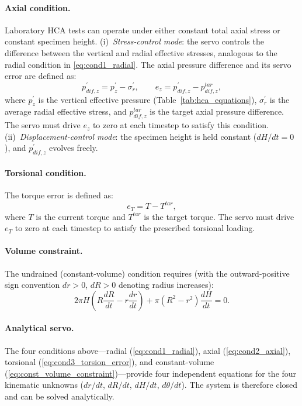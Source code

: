 \documentclass[a4paper,fleqn]{cas-sc}
\begin{document}
\paragraph{Axial condition.}
Laboratory HCA tests can operate under either constant total axial stress or constant specimen height.
(i)~\emph{Stress-control mode}: the servo controls the difference between the vertical and radial effective stresses, analogous to the radial condition in \cref{eq:cond1_radial}. The axial pressure difference and its servo error are defined as:
\begin{equation}
p_{dif,z}^{\prime} = p_z^{\prime} - \sigma_r^{\prime}, \qquad e_z = p_{dif,z}^{\prime} - p_{dif,z}^{tar},
\label{eq:cond2_axial}
\end{equation}
where $p_z^{\prime}$ is the vertical effective pressure (Table~\ref{tab:hca_equations}), $\sigma_r^{\prime}$ is the average radial effective stress, and $p_{dif,z}^{tar}$ is the target axial pressure difference. The servo must drive $e_z$ to zero at each timestep to satisfy this condition.
(ii)~\emph{Displacement-control mode}: the specimen height is held constant ($dH/dt=0$), and $p_{dif,z}^{\prime}$ evolves freely.

\paragraph{Torsional condition.}
The torque error is defined as:
\begin{equation}
e_T = T - T^{tar},
\label{eq:cond3_torsion_error}
\end{equation}
where $T$ is the current torque and $T^{tar}$ is the target torque. The servo must drive $e_T$ to zero at each timestep to satisfy the prescribed torsional loading.

\paragraph{Volume constraint.}
The undrained (constant-volume) condition requires (with the outward-positive sign convention $dr>0$, $dR>0$ denoting radius increases):
\begin{equation}
2\pi H\!\left(R\frac{dR}{dt} - r\frac{dr}{dt}\right) + \pi\!\left(R^2-r^2\right)\frac{dH}{dt} = 0.
\label{eq:const_volume_constraint}
\end{equation}

\paragraph{Analytical servo.}
The four conditions above---radial (\cref{eq:cond1_radial}), axial (\cref{eq:cond2_axial}), torsional (\cref{eq:cond3_torsion_error}), and constant-volume (\cref{eq:const_volume_constraint})---provide four independent equations for the four kinematic unknowns ($dr/dt$, $dR/dt$, $dH/dt$, $d\theta/dt$). The system is therefore closed and can be solved analytically.
\end{document}
